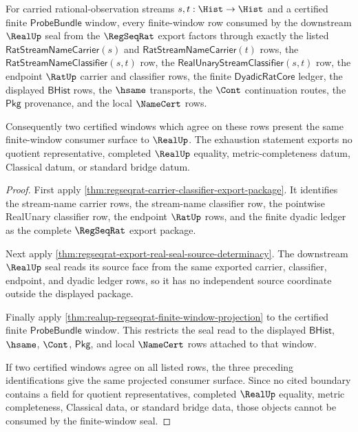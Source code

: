 \begin{theorem}
\label{thm:regseqrat-export-finite-window-row-exhaustion}
For carried rational-observation streams $s,t:\Hist\to\Hist$ and a certified
finite $\mathsf{ProbeBundle}$ window, every finite-window row consumed by the
downstream $\RealUp$ seal from the $\RegSeqRat$ export factors through exactly
the listed $\mathsf{RatStreamNameCarrier}(s)$ and
$\mathsf{RatStreamNameCarrier}(t)$ rows, the
$\mathsf{RatStreamNameClassifier}(s,t)$ row, the
$\mathsf{RealUnaryStreamClassifier}(s,t)$ row, the endpoint $\RatUp$ carrier
and classifier rows, the finite $\mathsf{DyadicRatCore}$ ledger, the displayed
$\mathsf{BHist}$ rows, the $\hsame$ transports, the $\Cont$ continuation
routes, the $\mathsf{Pkg}$ provenance, and the local $\NameCert$ rows.

Consequently two certified windows which agree on these rows present the same
finite-window consumer surface to $\RealUp$. The exhaustion statement exports
no quotient representative, completed $\RealUp$ equality, metric-completeness
datum, Classical datum, or standard bridge datum.
\end{theorem}
\begin{proof}
First apply
\autoref{thm:regseqrat-carrier-classifier-export-package}. It identifies the
stream-name carrier rows, the stream-name classifier row, the pointwise
RealUnary classifier row, the endpoint $\RatUp$ rows, and the finite dyadic
ledger as the complete $\RegSeqRat$ export package.

Next apply
\autoref{thm:regseqrat-export-real-seal-source-determinacy}. The downstream
$\RealUp$ seal reads its source face from the same exported carrier,
classifier, endpoint, and dyadic ledger rows, so it has no independent source
coordinate outside the displayed package.

Finally apply \autoref{thm:realup-regseqrat-finite-window-projection} to the
certified finite $\mathsf{ProbeBundle}$ window. This restricts the seal read to
the displayed $\mathsf{BHist}$, $\hsame$, $\Cont$, $\mathsf{Pkg}$, and local
$\NameCert$ rows attached to that window.

If two certified windows agree on all listed rows, the three preceding
identifications give the same projected consumer surface. Since no cited
boundary contains a field for quotient representatives, completed $\RealUp$
equality, metric completeness, Classical data, or standard bridge data, those
objects cannot be consumed by the finite-window seal.
\end{proof}

